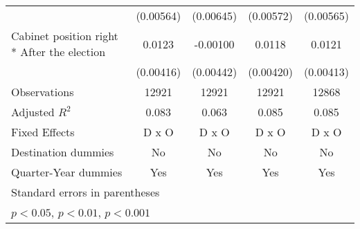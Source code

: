 \begin{table}[htbp]
\begin{tabular}{l*{4}{c}}
                    &   (0.00564)         &   (0.00645)         &   (0.00572)         &   (0.00565)         \\
[1em]
Cabinet position right * After the election&      0.0123\sym{**} &    -0.00100         &      0.0118\sym{**} &      0.0121\sym{**} \\
                    &   (0.00416)         &   (0.00442)         &   (0.00420)         &   (0.00413)         \\
\hline
Observations        &       12921         &       12921         &       12921         &       12868         \\
Adjusted \(R^{2}\)  &       0.083         &       0.063         &       0.085         &       0.085         \\
Fixed Effects       &       D x O         &       D x O         &       D x O         &       D x O         \\
Destination dummies &          No         &          No         &          No         &          No         \\
Quarter-Year dummies&         Yes         &         Yes         &         Yes         &         Yes         \\
\hline\hline
\multicolumn{5}{l}{\footnotesize Standard errors in parentheses}\\
\multicolumn{5}{l}{\footnotesize \sym{*} \(p<0.05\), \sym{**} \(p<0.01\), \sym{***} \(p<0.001\)}\\
\end{tabular}
\end{table}
